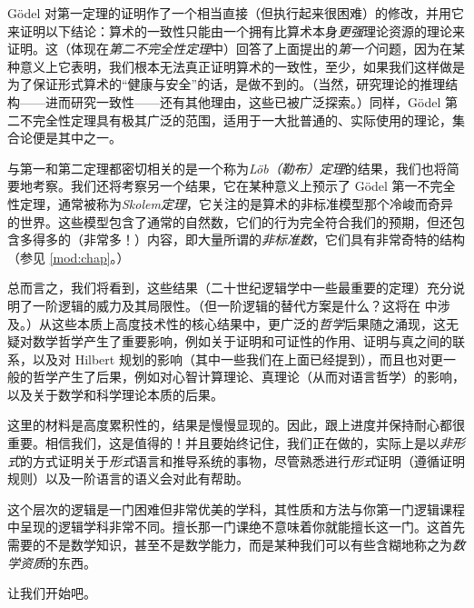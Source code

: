 Gödel 对第一定理的证明作了一个相当直接（但执行起来很困难）的修改，并用它来证明以下结论：算术的一致性只能由一个拥有比算术本身\emph{更强}理论资源的理论来证明。这（体现在\emph{第二不完全性定理}中）回答了上面提出的\emph{第一个}问题，因为在某种意义上它表明，我们根本无法真正证明算术的一致性，至少，如果我们这样做是为了保证形式算术的“健康与安全”的话，是做不到的。（当然，研究理论的推理结构——进而研究一致性——还有其他理由，这些已被广泛探索。）同样，Gödel 第二不完全性定理具有极其广泛的范围，适用于一大批普通的、实际使用的理论，集合论便是其中之一。

与第一和第二定理都密切相关的是一个称为\emph{Löb（勒布）定理}的结果，我们也将简要地考察。我们还将考察另一个结果，它在某种意义上预示了 Gödel 第一不完全性定理，通常被称为\emph{Skolem定理}，它关注的是算术的非标准模型那个冷峻而奇异的世界。这些模型包含了通常的自然数，它们的行为完全符合我们的预期，但还包含多得多的（非常多！{}）内容，即大量所谓的\emph{非标准数}，它们具有非常奇特的结构（参见 \cref{mod:chap}。）

总而言之，我们将看到，这些结果（二十世纪逻辑学中一些最重要的定理）充分说明了一阶逻辑的威力及其局限性。（但一阶逻辑的替代方案是什么？这将在  中涉及。）从这些本质上高度技术性的核心结果中，更广泛的\emph{哲学}后果随之涌现，这无疑对数学哲学产生了重要影响，例如关于证明和可证性的作用、证明与真之间的联系，以及对 Hilbert 规划的影响（其中一些我们在上面已经提到），而且也对更一般的哲学产生了后果，例如对心智计算理论、真理论（从而对语言哲学）的影响，以及关于数学和科学理论本质的后果。

\bigskip

\noindent 这里的材料是高度累积性的，结果是慢慢显现的。因此，跟上进度并保持耐心都很重要。相信我们，这是值得的！{}并且要始终记住，我们正在做的，实际上是以\emph{非形式}的方式证明关于\emph{形式}语言和推导系统的事物，尽管熟悉进行\emph{形式}证明（遵循证明规则）以及一阶语言的语义会对此有帮助。

这个层次的逻辑是一门困难但非常优美的学科，其性质和方法与你第一门逻辑课程中呈现的逻辑学科非常不同。擅长那一门课绝不意味着你就能擅长这一门。这首先需要的不是数学知识，甚至不是数学能力，而是某种我们可以有些含糊地称之为\emph{数学资质}的东西。

让我们开始吧。



